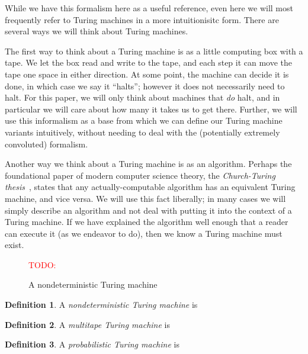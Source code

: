 \documentclass[english,12pt]{reedthesis}
\theoremstyle{plain}
\theoremstyle{definition}
\newtheorem{defn}[defn]{Definition}
\theoremstyle{remark}
\newcommand{\TODO}[1]{\textcolor{red}{TODO: #1}}
\begin{document}
While we have this formalism here as a useful reference, even here we will most
frequently refer to Turing machines in a more intuitionisitc form. There are
several ways we will think about Turing machines.

The first way to think about a Turing machine is as a little computing box with
a tape. We let the box read and write to the tape, and each step it can move the
tape one space in either direction. At some point, the machine can decide it is
done, in which case we say it ``halts''; however it does not necessarily need to
halt. For this paper, we will only think about machines that \emph{do} halt, and
in particular we will care about how many it takes us to get there. Further, we
will use this informalism as a base from which we can define our Turing machine
variants intuitively, without needing to deal with the (potentially extremely
convoluted) formalism.

Another way we think about a Turing machine is as an algorithm. Perhaps the
foundational paper of modern computer science theory, the \emph{Church-Turing
  thesis}~\cite{Tur36}, states that any actually-computable algorithm has an
equivalent Turing machine, and vice versa. We will use this fact liberally; in
many cases we will simply describe an algorithm and not deal with putting it
into the context of a Turing machine. If we have explained the algorithm well
enough that a reader can execute it (as we endeavor to do), then we know a
Turing machine must exist.

\begin{figure}[htbp]
  \centering
  \TODO{}
  \begin{tikzpicture}
  \end{tikzpicture}
  \caption{A nondeterministic Turing machine}\label{fig:ntm}
\end{figure}

\begin{defn}\label{def:nondeterministic-tm}
  A \emph{nondeterministic Turing machine} is %
\end{defn}

\begin{defn}\label{def:multitape-tm}
  A \emph{multitape Turing machine} is
\end{defn}

\begin{defn}\label{def:prob-tm}
  A \emph{probabilistic Turing machine} is
\end{defn}
\end{document}
